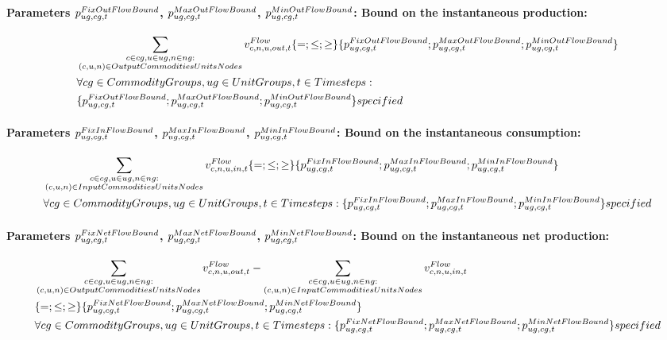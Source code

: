 \paragraph{Parameters $\pFixOutFlowBound$, $\pMaxOutFlowBound$, $\pMinOutFlowBound$: Bound on the instantaneous production:}
\begin{align} \label{eq:outflowbound}
&\sum_{\substack{\commodity \in \commoditygroup, \unit \in \unitgroup, \node \in \nodegroup: \\ \OutputCommoditiesUnitsNodes}} \vFlow[\commodity,\node,\unit,out,\timestep]  \{=;\le;\ge\} \{\pFixOutFlowBound;\pMaxOutFlowBound;\pMinOutFlowBound\} \nonumber \\
&\forall \commoditygroups, \unitgroups, \timesteps : \nonumber \\
&\{\pFixOutFlowBound;\pMaxOutFlowBound;\pMinOutFlowBound\} specified
\end{align}

\paragraph{Parameters $\pFixInFlowBound$, $\pMaxInFlowBound$, $\pMinInFlowBound$: Bound on the instantaneous consumption:}
\begin{align} \label{eq:inflowbound}
&\sum_{\substack{\commodity \in \commoditygroup, \unit \in \unitgroup, \node \in \nodegroup: \\ \InputCommoditiesUnitsNodes}} \vFlow[\commodity,\node,\unit,in,\timestep]  \{=;\le;\ge\} \{\pFixInFlowBound ; \pMaxInFlowBound ; \pMinInFlowBound\} \nonumber \\
&\forall \commoditygroups, \unitgroups, \timesteps : \{\pFixInFlowBound ; \pMaxInFlowBound ; \pMinInFlowBound\} specified
\end{align}

\paragraph{Parameters $\pFixNetFlowBound$, $\pMaxNetFlowBound$, $\pMinNetFlowBound$: Bound on the instantaneous net production:}
\begin{align} \label{eq:netflowbound}
&\sum_{\substack{\commodity \in \commoditygroup, \unit \in \unitgroup, \node \in \nodegroup: \\ \OutputCommoditiesUnitsNodes}} \vFlow[\commodity,\node,\unit,out,\timestep] - \sum_{\substack{\commodity \in \commoditygroup, \unit \in \unitgroup, \node \in \nodegroup: \\ \InputCommoditiesUnitsNodes}} \vFlow[\commodity,\node,\unit,in,\timestep]  \nonumber \\
&\{=;\le;\ge\} \{\pFixNetFlowBound;\pMaxNetFlowBound;\pMinNetFlowBound\} \nonumber \\
&\forall \commoditygroups, \unitgroups, \timesteps : \{\pFixNetFlowBound;\pMaxNetFlowBound;\pMinNetFlowBound \} specified
\end{align}

